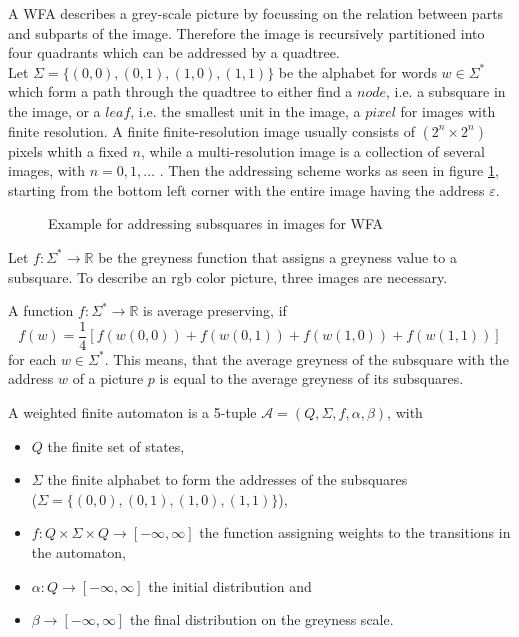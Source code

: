 \documentclass{article}
\begin{document}
A WFA describes a grey-scale picture by focussing on the relation between parts and subparts of the image. Therefore the image is recursively partitioned into four quadrants which can be addressed by a quadtree. \\
Let $\Sigma = \{ (0,0), (0,1), (1,0),(1,1)\}$ be the alphabet for words $w \in \Sigma^*$ which form a path through the quadtree to either find a $node$, i.e. a subsquare in the image, or a $leaf$, i.e. the smallest unit in the image, a $pixel$ for images with finite resolution. A finite finite-resolution image usually consists of $(2^n \times 2^n)$ pixels whith a fixed $n$, while a multi-resolution image is a collection of several images, with $n=0,1,\dots$ . Then the addressing scheme works as seen in figure \ref{fig:addr}, starting from the bottom left corner with the entire image having the address $\varepsilon$.
\begin{figure}[ht]
\centering
 
\caption{Example for addressing subsquares in images for WFA}
\label{fig:addr}
\end{figure}

Let $f: \Sigma^* \rightarrow \mathbb{R}$ be the greyness function that assigns a greyness value to a subsquare. To describe an rgb color picture, three images are necessary.

A function $f: \Sigma^* \rightarrow \mathbb{R}$ is average preserving, if 
$$f(w) = \frac{1}{4}[f(w(0,0)) + f(w(0,1)) + f(w(1,0)) + f(w(1,1))] $$
for each $w \in \Sigma^*$. This means, that the average greyness of the subsquare with the address $w$ of a picture $p$ is equal to the average greyness of its subsquares. 

A weighted finite automaton is a 5-tuple $\mathcal{A}= (Q, \Sigma, f, \alpha, \beta)$, with 
\begin{itemize}
 \item $Q$ the finite set of states,
 \item $\Sigma$ the finite alphabet to form the addresses of the subsquares\\($\Sigma = \{(0,0), (0,1),(1,0),(1,1)\}$),
 \item $f: Q \times \Sigma \times Q \rightarrow [-\infty, \infty]$ the function assigning weights to the transitions in the automaton,
 \item $\alpha: Q \rightarrow [-\infty, \infty]$ the initial distribution and
 \item $\beta \rightarrow [-\infty, \infty]$ the final distribution on the greyness scale.
\end{itemize}
\end{document}
